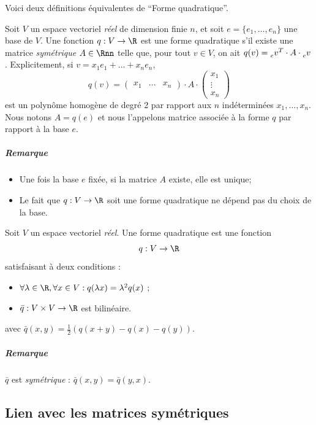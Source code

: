 Voici deux définitions équivalentes de ``Forme quadratique''.

\begin{mydef}
	Soit $V$ un espace vectoriel \emph{réel} de dimension finie $n$,
	et soit $e = \{e_1, \dots, e_n\}$ une base de $V$.
	Une fonction $q: V \to \R$ est une forme quadratique s'il existe
	une matrice \emph{symétrique} $A \in \Rnn$ telle que, pour tout $v \in V$,
	on ait $q(v) = \tensor[_e]{v}{^T} \cdot A \cdot \tensor[_e]{v}{}$.
	Explicitement, si $v = x_1e_1 + \dots + x_ne_n$,
	\[ q(v) = \begin{pmatrix}x_1 & \dots & x_n\end{pmatrix} \cdot A \cdot \begin{pmatrix}x_1\\\vdots\\x_n\end{pmatrix} \]
	est un polynôme homogène de degré 2 par rapport aux $n$ indéterminées $x_1, \dots, x_n$.
	Nous notons $A = q(e)$ et nous l'appelons matrice associée à la forme $q$ par rapport à la base $e$.
	\subparagraph{Remarque}
	\begin{itemize}
		\item Une fois la base $e$ fixée, si la matrice $A$ existe, elle est unique;
		\item Le fait que $q: V \to \R$ soit une forme quadratique ne dépend pas du choix de la base.
	\end{itemize}
\end{mydef}

\begin{mydef}
	Soit $V$ un espace vectoriel \emph{réel}.
	Une forme quadratique est une fonction
	\[ q : V \rightarrow \R \]
	satisfaisant à deux conditions :
	\begin{itemize}
		\item $\forall \lambda \in \R, \forall x \in V : q(\lambda x) = \lambda^2 q(x)$ ;
		\item $\bar{q} : V \times V \rightarrow \R$ est bilinéaire.
	\end{itemize}
	avec $\bar{q}(x,y) = \frac 12 (q(x+y) - q(x) - q(y) )$.
	\subparagraph{Remarque}
	$\bar{q}$ est \emph{symétrique} : $\bar{q}(x,y) = \bar{q}(y,x)$.
\end{mydef}

\subsection{Lien avec les matrices symétriques}

